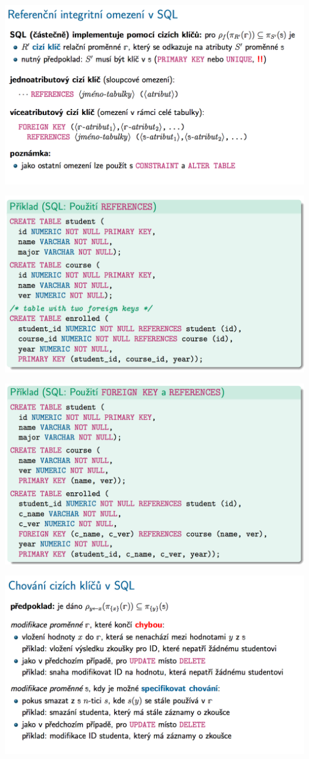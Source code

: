 \documentclass[10pt,a4paper]{article}
\begin{document}
	\includegraphics[scale=0.4]{img/66}
	
	\includegraphics[scale=0.4]{img/67}
	
	\includegraphics[scale=0.4]{img/68}
	
	\includegraphics[scale=0.4]{img/69}
	
\end{document}
